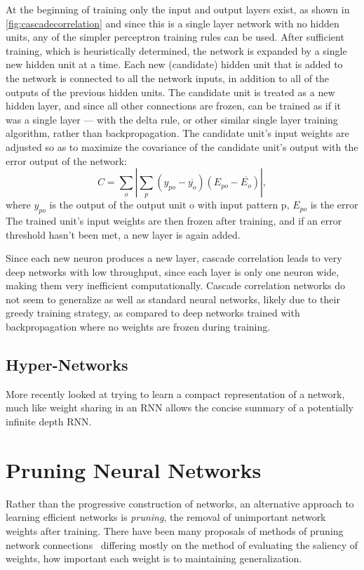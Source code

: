 \documentclass[thesis]{subfiles}
\begin{document}
	At the beginning of training only the input and output layers exist, as shown in \cref{fig:cascadecorrelation} and since this is a single layer network with no hidden units, any of the simpler perceptron training rules can be used. After sufficient training, which is heuristically determined, the network is expanded by a single new hidden unit at a time.
	Each new (candidate) hidden unit that is added to the network is connected to all the network inputs, in addition to all of the outputs of the previous hidden units. The candidate unit is treated as a new hidden layer, and since all other connections are frozen, can be trained as if it was a single layer --- \ie with the delta rule, or other similar single layer training algorithm, rather than backpropagation. The candidate unit's input weights are adjusted so as to maximize the covariance of the candidate unit's output with the error output of the network:
	\begin{equation}
	    C = \sum_o \left|\sum_p (y_{po} - \overline{y_o})(E_{po} - \overline{E_o})\right|,
	\end{equation}
	where $y_{po}$ is the output of the output unit o with input pattern p, $E_{po}$ is the error The trained unit's input weights are then frozen after training, and if an error threshold hasn't been met, a new layer is again added.
	
	Since each new neuron produces a new layer, cascade correlation leads to very deep networks with low throughput, since each layer is only one neuron wide, making them very inefficient computationally. Cascade correlation networks do not seem to generalize as well as standard neural networks, likely due to their greedy training strategy, as compared to deep networks trained with backpropagation where no weights are frozen during training.
	
	
	\subsection{Hyper-Networks}
	More recently \citet{hypernetworks} looked at trying to learn a compact representation of a network, much like weight sharing in an RNN allows the concise summary of a potentially infinite depth RNN\@.
	\section{Pruning Neural Networks}
    Rather than the progressive construction of networks, an alternative approach to learning efficient networks is \emph{pruning}, the removal of unimportant network weights after training. There have been many proposals of methods of pruning network connections~\citep{lecun1989optimal,sietsma1988neural,han2015deep,ullrich2017soft,}
 differing mostly on the method of evaluating the saliency of weights, \ie how important each weight is to maintaining generalization. 
    
\end{document}
